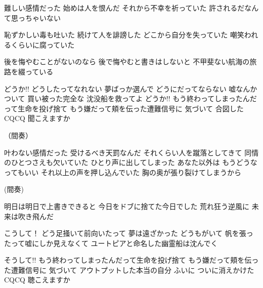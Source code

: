 \documentclass{article}
\begin{document}
難しい感情だった
始めは人を恨んだ
それから不幸を祈っていた
許されるだなんて思っちゃいない

恥ずかしい毒も吐いた
続けて人を誹謗した
どこから自分を失っていた
嘲笑われるくらいに腐っていた

後を悔やむことがないのなら
後で悔やむと書きはしないと
不甲斐ない航海の旅路を綴っている

どうか!! どうしたってなれない 夢ばっか選んで
どうにだってならない 嘘なんかついて
買い被った完全な 沈没船を救ってよ
どうか!! もう終わってしまったんだって生命を投げ捨て
もう嫌だって頬を伝った遭難信号に
気づいて 合図した
CQCQ 聞こえますか

（間奏）

叶わない感情だった
受けるべき天罰なんだ
それくらい人を蹴落としてきて
同情のひとつさえも欠いていた
ひとり声に出してしまった
あなた以外は もうどうなってもいい
それ以上の声を押し込んでいた
胸の奥が張り裂けてしまうから

(間奏)

明日は明日で上書きできると
今日をドブに捨てた今日でした
荒れ狂う逆風に 未来は吹き飛んだ

こうして！ どう足掻いて前向いたって 夢は遠ざかった
どうもがいて 帆を張ったって嘘にしか見えなくて
ユートピアと命名した幽霊船は沈んでく

そうして!! もう終わってしまったんだって生命を投げ捨て
もう嫌だって頬を伝った遭難信号に
気づいて アウトプットした本当の自分
ふいに ついに消えかけた
CQCQ 聴こえますか
\end{document}
